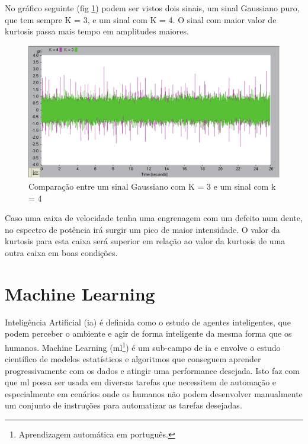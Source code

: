 No gráfico seguinte (fig \ref{kurtosis1}) podem ser vistos dois sinais, um sinal Gaussiano puro, que tem sempre K = 3, e um sinal com K = 4. O sinal com maior valor de kurtosis passa mais tempo em amplitudes maiores.


\begin{figure}[H]
\centering
\includegraphics[scale=0.3]{figs/Kurtosis1}
\caption{Comparação entre um sinal Gaussiano com K = 3 e um sinal com k = 4 }\label{kurtosis1}
\end{figure}

Caso uma caixa de velocidade tenha uma engrenagem com um defeito num dente, no espectro de potência irá surgir um pico de maior intensidade. O valor da kurtosis para esta caixa será superior em relação ao valor da kurtosis de uma outra caixa em boas condições.






\section{Machine Learning}

Inteligência Artificial (\ac{ia}) é definida como o estudo de agentes inteligentes, que podem perceber o ambiente e agir de forma inteligente da mesma forma que os humanos.
Machine Learning (\ac{ml}\footnote{Aprendizagem automática em português.}) é um sub-campo de \ac{ia} e envolve o estudo científico de modelos estatísticos e algoritmos que conseguem aprender progressivamente com os dados e atingir uma performance desejada.
Isto faz com que \ac{ml} possa ser usada em diversas tarefas que necessitem de automação e especialmente em cenários onde os humanos não podem desenvolver manualmente um conjunto de instruções para automatizar as tarefas desejadas. 

